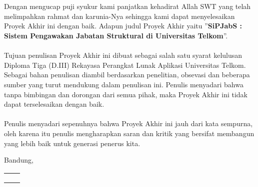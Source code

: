 \chapter*{\kataPengantar}
\noindent
Dengan mengucap puji syukur kami panjatkan kehadirat Allah SWT yang telah melimpahkan rahmat dan karunia-Nya sehingga kami dapat menyelesaikan Proyek Akhir ini dengan baik. Adapun judul Proyek Akhir yaitu ”\textbf{SiPJabS : Sistem Pengawakan Jabatan Struktural di Universitas Telkom}”. 
\\
\\
Tujuan penulisan Proyek Akhir ini dibuat sebagai salah satu syarat kelulusan Diploma Tiga (D.III) Rekayasa Perangkat Lunak Aplikasi Universitas Telkom. Sebagai bahan penulisan diambil berdasarkan penelitian, obsevasi dan beberapa sumber yang turut mendukung dalam penulisan ini. Penulis menyadari bahwa tanpa bimbingan dan dorongan dari semua pihak, maka Proyek Akhir ini tidak dapat terselesaikan dengan baik. 
\\
\\
Penulis menyadari sepenuhnya bahwa Proyek Akhir ini jauh dari kata sempurna, oleh karena itu penulis mengharapkan saran dan kritik yang bersifat membangun yang lebih baik untuk generasi penerus kita.
 
\vspace*{0.1cm}
\begin{flushright}
Bandung, \tanggalPengesahan\\

 \begin{tabular}{ll} \\ [0.5 cm]
 	 \\ [0.5 cm]
	\penulistu 	& \penulisdu \\
	\nimtu 		& \nimdu \\
\end{tabular}


\end{flushright}